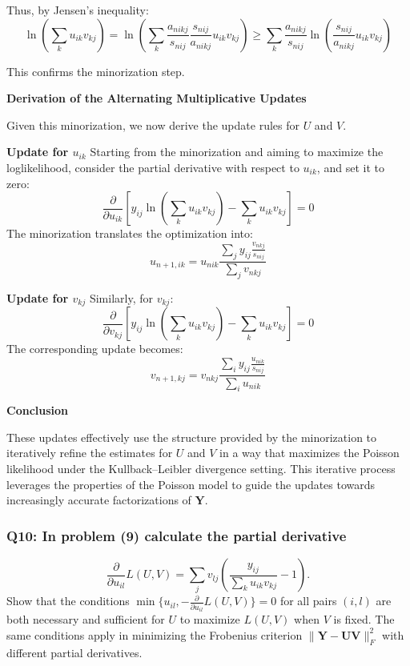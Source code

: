 \documentclass[8pt]{article}
\begin{document}
Thus, by Jensen's inequality:
\[
\ln \left( \sum_k u_{ik}v_{kj} \right) = \ln \left( \sum_k \frac{a_{nikj}}{s_{nij}} \frac{s_{nij}}{a_{nikj}} u_{ik}v_{kj} \right) \geq \sum_k \frac{a_{nikj}}{s_{nij}} \ln \left( \frac{s_{nij}}{a_{nikj}} u_{ik}v_{kj} \right)
\]

This confirms the minorization step.

\textbf{Derivation of the Alternating Multiplicative Updates}

Given this minorization, we now derive the update rules for \( U \) and \( V \).

\textbf{Update for \( u_{ik} \)}
Starting from the minorization and aiming to maximize the loglikelihood, consider the partial derivative with respect to \( u_{ik} \), and set it to zero:
\[
\frac{\partial}{\partial u_{ik}} \left[ y_{ij} \ln \left( \sum_k u_{ik}v_{kj} \right) - \sum_k u_{ik}v_{kj} \right] = 0
\]
The minorization translates the optimization into:
\[
u_{n+1,ik} = u_{nik} \frac{\sum_j y_{ij} \frac{v_{nkj}}{s_{nij}}}{\sum_j v_{nkj}}
\]

\textbf{Update for \( v_{kj} \)}
Similarly, for \( v_{kj} \):
\[
\frac{\partial}{\partial v_{kj}} \left[ y_{ij} \ln \left( \sum_k u_{ik}v_{kj} \right) - \sum_k u_{ik}v_{kj} \right] = 0
\]
The corresponding update becomes:
\[
v_{n+1,kj} = v_{nkj} \frac{\sum_i y_{ij} \frac{u_{nik}}{s_{nij}}}{\sum_i u_{nik}}
\]

\textbf{Conclusion}

These updates effectively use the structure provided by the minorization to iteratively refine the estimates for \( U \) and \( V \) in a way that maximizes the Poisson likelihood under the Kullback–Leibler divergence setting. This iterative process leverages the properties of the Poisson model to guide the updates towards increasingly accurate factorizations of \( \mathbf{Y} \).

\subsubsection*{Q10: In problem (9) calculate the partial derivative}
\[
\frac{\partial}{\partial u_{il}} L(U, V) = \sum_j v_{lj} \left( \frac{y_{ij}}{\sum_k u_{ik}v_{kj}} - 1 \right).
\]
\noindent Show that the conditions \(\min\{u_{il}, - \frac{\partial}{\partial u_{il}} L(U, V)\} = 0\) for all pairs \((i, l)\) are both necessary and sufficient for \(U\) to maximize \(L(U, V)\) when \(V\) is fixed. The same conditions apply in minimizing the Frobenius criterion \(\|\mathbf{Y} - \mathbf{U} \mathbf{V}\|_F^2\) with different partial derivatives.
\end{document}
